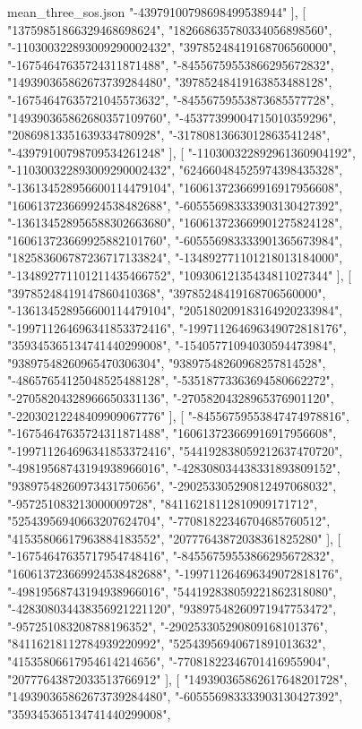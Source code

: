 \begin{filecontents*}[overwrite]{mean_three_sos.json}
    "-43979100798698499538944"
   ],
   [
    "13759851866329468698624",
    "182668635780334056898560",
    "-110300322893009290002432",
    "39785248419168706560000",
    "-16754647635724311871488",
    "-84556759553866295672832",
    "149390365862673739284480",
    "39785248419163853488128",
    "-16754647635721045573632",
    "-84556759553873685577728",
    "149390365862680357109760",
    "-45377399004715010359296",
    "20869813351639334780928",
    "-31780813663012863541248",
    "-43979100798709534261248"
   ],
   [
    "-110300322892961360904192",
    "-110300322893009290002432",
    "624660484525974398435328",
    "-136134528956600114479104",
    "160613723669916917956608",
    "160613723669924538482688",
    "-605556983333903130427392",
    "-136134528956588302663680",
    "160613723669901275824128",
    "160613723669925882101760",
    "-605556983333901365673984",
    "182583606787236717133824",
    "-134892771101218013184000",
    "-134892771101211435466752",
    "10930612135434811027344"
   ],
   [
    "39785248419147860410368",
    "39785248419168706560000",
    "-136134528956600114479104",
    "205180209183164920233984",
    "-199711264696341853372416",
    "-199711264696349072818176",
    "359345365134741440299008",
    "-15405771094030594473984",
    "93897548260965470306304",
    "93897548260968257814528",
    "-48657654125048525488128",
    "-53518773363694580662272",
    "-27058204328966650331136",
    "-27058204328965376901120",
    "-22030212248409909067776"
   ],
   [
    "-84556759553847474978816",
    "-16754647635724311871488",
    "160613723669916917956608",
    "-199711264696341853372416",
    "544192838059212637470720",
    "-49819568743194938966016",
    "-428308034438331893809152",
    "93897548260973431750656",
    "-290253305290812497068032",
    "-957251083213000009728",
    "84116218112810909171712",
    "52543956940663207624704",
    "-77081822346704685760512",
    "41535806617963884183552",
    "20777643872038361825280"
   ],
   [
    "-16754647635717954748416",
    "-84556759553866295672832",
    "160613723669924538482688",
    "-199711264696349072818176",
    "-49819568743194938966016",
    "544192838059221862318080",
    "-428308034438356921221120",
    "93897548260971947753472",
    "-957251083208788196352",
    "-290253305290809168101376",
    "84116218112784939220992",
    "52543956940671891013632",
    "41535806617954614214656",
    "-77081822346701416955904",
    "20777643872033513766912"
   ],
   [
    "149390365862617648201728",
    "149390365862673739284480",
    "-605556983333903130427392",
    "359345365134741440299008",

\end{filecontents*}
